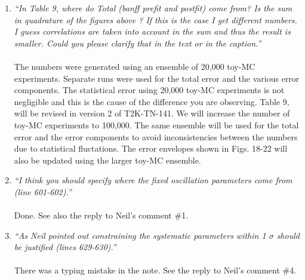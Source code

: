 \begin{enumerate}
\vspace{5 mm}
\item
{\em
  ``In Table 9, where do Total (banff prefit and postfit) come from? 
    Is the sum in quadrature of the figures above ? If this is the case I get different numbers. 
    I guess correlations are taken into account in the sum and thus the result is smaller. 
    Could you please clarify that in the text or in the caption.''
}\\
\\
The numbers were generated using an ensemble of 20,000 toy-MC experiments.
Separate runs were used for the total error and the various error components.
The statistical error using 20,000 toy-MC experiments is not negligible and this is
the cause of the difference you are observing. Table 9, will be revised
in version 2 of T2K-TN-141. 
We will increase the number of toy-MC experiments to 100,000.
The same ensemble will be used for the total error and the error components
to avoid inconsistencies between the numbers due to statistical fluctations.
The error envelopes shown in Figs. 18-22 will also be updated using the larger toy-MC ensemble.

\vspace{5 mm}
\item
{\em
  ``I think you should specify where the fixed oscillation parameters come from (line 601-602).''
}\\
\\
Done. See also the reply to Neil's comment \#1.

\vspace{5 mm}
\item
{\em
  ``As Neil pointed out constraining the systematic parameters within 1 $\sigma$ should be 
  justified (lines 629-630).''
}\\
\\
There was a typing mistake in the note.
See the reply to Neil's comment \#4.


\end{enumerate}
